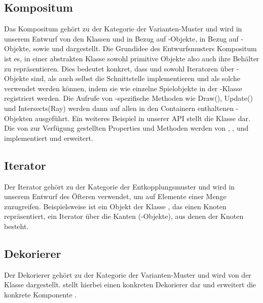 \subsection{Kompositum}
Das Kompositum gehört zu der Kategorie der Varianten-Muster und wird in unserem Entwurf von den Klassen  und  in Bezug auf -Objekte,  in Bezug auf -Objekte, sowie  und  dargestellt.
\newline
\newline
Die Grundidee des Entwurfsmusters Kompositum ist es, in einer abstrakten Klasse sowohl primitive Objekte also auch ihre Behälter zu repräsentieren.
\newline
Dies bedeutet konkret, dass  und  sowohl Iteratoren über -Objekte sind, als auch selbst die Schnittstelle  implementieren und als solche verwendet werden können, indem sie wie einzelne Spielobjekte in der -Klasse registriert werden. Die Aufrufe von -spezifische Methoden wie Draw(), Update() und Intersects(Ray) werden dann auf allen in den Containern enthaltenen -Objekten ausgeführt.
\newline
\newline
Ein weiteres Beispiel in unserer API stellt die Klasse  dar. Die von  zur Verfügung gestellten Properties und Methoden werden von , ,  und  implementiert und erweitert.

\subsection{Iterator}
Der Iterator gehört zu der Kategorie der Entkopplungsmuster und wird in unserem Entwurf des Öfteren verwendet, um auf Elemente einer Menge zuzugreifen. Beispielsweise ist ein Objekt der Klasse , das einen Knoten repräsentiert, ein Iterator über die Kanten (-Objekte), aus denen der Knoten besteht.


\subsection{Dekorierer}
Der Dekorierer gehört zu der Kategorie der Varianten-Muster und wird von der Klasse  dargestellt. 
 stellt hierbei einen konkreten Dekorierer dar und erweitert die konkrete Komponente .

